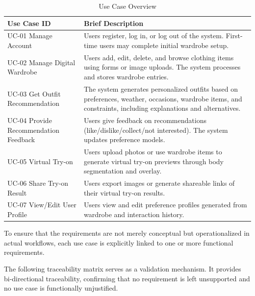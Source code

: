 \begin{table}[H]
\centering
\caption{Use Case Overview}
\label{tab:uc_overview}
\begin{tabular}{p{4cm} p{12cm}}
\toprule
\textbf{Use Case ID} & \textbf{Brief Description} \\
\midrule
UC-01 Manage Account &
Users register, log in, or log out of the system. First-time users may complete initial wardrobe setup. \\
UC-02 Manage Digital Wardrobe &
Users add, edit, delete, and browse clothing items using forms or image uploads. The system processes and stores wardrobe entries. \\
UC-03 Get Outfit Recommendation &
The system generates personalized outfits based on preferences, weather, occasions, wardrobe items, and constraints, including explanations and alternatives. \\
UC-04 Provide Recommendation Feedback &
Users give feedback on recommendations (like/dislike/collect/not interested). The system updates preference models. \\
UC-05 Virtual Try-on &
Users upload photos or use wardrobe items to generate virtual try-on previews through body segmentation and overlay. \\
UC-06 Share Try-on Result &
Users export images or generate shareable links of their virtual try-on results. \\
UC-07 View/Edit User Profile &
Users view and edit preference profiles generated from wardrobe and interaction history. \\
\bottomrule
\end{tabular}
\end{table}



To ensure that the requirements are not merely conceptual but operationalized in actual workflows, each use case is explicitly linked to one or more functional requirements.

The following traceability matrix serves as a validation mechanism. It provides bi-directional traceability, confirming that no requirement is left unsupported and no use case is functionally unjustified.

